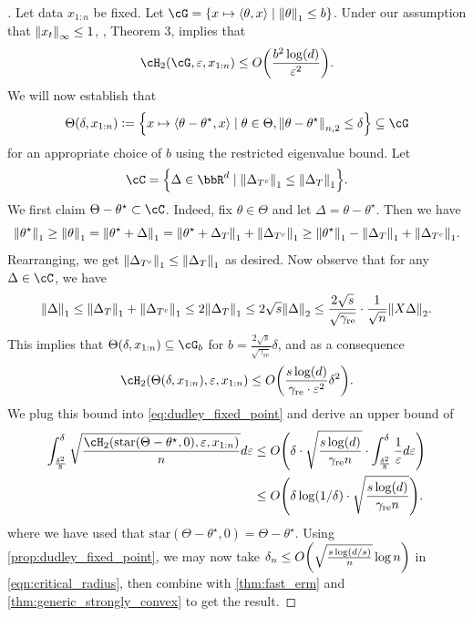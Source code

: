 \documentclass[11pt]{article} %
\newcommand{\pref}[1]{\cref{#1}}
\theoremstyle{theorem}  %
\theoremstyle{plain}
\DeclarePairedDelimiter{\crl}{\{}{\}}
\DeclarePairedDelimiter{\prn}{(}{)}
\DeclarePairedDelimiter{\nrm}{\|}{\|}
\DeclarePairedDelimiter{\tri}{\langle}{\rangle}
\newcommand{\veps}{\varepsilon}
\newcommand{\ldef}{\vcentcolon=}
\newcommand{\xr}[1][n]{x_{1:#1}}
\newcommand{\starhull}{\mathrm{star}}
\newcommand{\target}{\Theta}
\newcommand{\besttwo}{\theta^{\star}}
\begin{document}
\begin{proof}[\text{Proof for \pref{ex:lasso}}]
Let data $\xr[n]$ be fixed. Let $\cG = \crl*{x\mapsto{}\tri*{\theta,x}\mid{}\nrm*{\theta}_{1}\leq{}b}$. Under our assumption that $\nrm*{x_t}_{\infty}\leq{}1$, \cite{zhang2002covering}, Theorem 3, implies that
\[
\cH_2(\cG,\veps,\xr[n]) \leq{} O\prn*{\frac{b^{2}\log(d)}{\veps^{2}}}.
\]
We will now establish that \[\target(\delta,\xr[n])\ldef\crl*{x\mapsto\tri*{\theta-\besttwo,x}\mid{}\theta\in\target,\nrm*{\theta-\besttwo}_{n,2}\leq{}\delta}\subseteq{}\cG\] for an appropriate choice of $b$ using the restricted eigenvalue bound. 
Let \[\cC=\crl*{\Delta\in\bbR^{d}\mid{}\nrm*{\Delta_{T^{c}}}_{1}\leq{}\nrm*{\Delta_{T}}_{1}}.\] We first claim $\target-\besttwo\subset{}\cC$. Indeed, fix $\theta\in\target$ and let $\Delta=\theta-\besttwo$. Then we have
\[
\nrm*{\besttwo}_{1}\geq{}\nrm*{\theta}_{1} = \nrm*{\besttwo + \Delta}_1 = \nrm*{\besttwo + \Delta_{T}}_1 + \nrm*{\Delta_{T^{c}}}_1
\geq \nrm*{\besttwo}_{1}- \nrm*{\Delta_{T}}_1 + \nrm*{\Delta_{T^{c}}}_1.
\]
Rearranging, we get $\nrm*{\Delta_{T^{c}}}_{1}\leq{}\nrm*{\Delta_{T}}_{1}$ as desired. Now observe that for any $\Delta\in\cC$, we have
\[
\nrm*{\Delta}_{1}\leq{}\nrm*{\Delta_{T}}_{1} + \nrm*{\Delta_{T^{c}}}_{1}
\leq{}2\nrm*{\Delta_{T}}_{1} \leq{}2\sqrt{s}\nrm*{\Delta}_{2}\leq{}\frac{2\sqrt{s}}{\sqrt{\gamma_{\mathrm{re}}}}\cdot\frac{1}{\sqrt{n}}\nrm*{X\Delta}_{2}.
\]
This implies that $\target(\delta,\xr[n])\subseteq\cG_{b}$ for $b=\frac{2\sqrt{s}}{\sqrt{\gamma_{\mathrm{re}}}}\delta$, and as a consequence
\[
\cH_2(\target(\delta,\xr[n]),\veps,\xr[n]) \leq{} O\prn*{\frac{s\log(d)}{\gamma_{\mathrm{re}}\cdot\veps^{2}}\delta^{2}}.
\]
We plug this bound into \pref{eq:dudley_fixed_point} and derive an upper bound of
\begin{align*}
\int_{\frac{\delta^{2}}{8}}^{\delta} \sqrt{\frac{\cH_2(\starhull(\target-\besttwo,0),\veps,\xr[n])}{n}} d\veps &\leq{} 
O\prn*{\delta\cdot{}\sqrt{\frac{s\log(d)}{\gamma_{\mathrm{re}}n}}
\cdot\int_{\frac{\delta^{2}}{8}}^{\delta}\frac{1}{\veps}d\veps}\\
&\leq{} 
O\prn*{\delta\log(1/\delta)\cdot{}\sqrt{\frac{s\log(d)}{\gamma_{\mathrm{re}}n}}}.
\end{align*}
where we have used that $\starhull(\target-\besttwo,0)=\target-\besttwo$.
Using \pref{prop:dudley_fixed_point}, we may now take $\delta_{n}\leq{}O\prn*{\sqrt{\frac{s\log(d/s)}{n}}\log{}n}$ in \pref{eqn:critical_radius}, then combine with \pref{thm:fast_erm} and \pref{thm:generic_strongly_convex} to get the result.

  
\end{proof}
\end{document}
